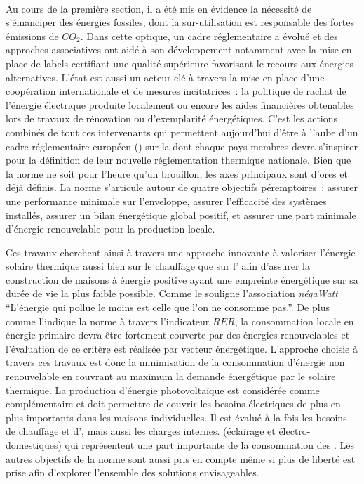 \paragraph{} %
Au cours de la première section, il a été mis en évidence la nécessité de s’émanciper des
énergies fossiles, dont la sur-utilisation est responsable des fortes émissions de
$CO_{2}$. Dans cette optique, un cadre réglementaire a évolué et des approches
associatives ont aidé à son développement notamment avec la mise en place de labels
certifiant une qualité supérieure favorisant le recours aux énergies alternatives. L’état est
aussi un acteur clé à travers la mise en place d’une coopération internationale et de
mesures incitatrices~: la politique de rachat de l’énergie électrique produite localement
ou encore les aides financières obtenables lors de travaux de rénovation ou d’exemplarité
énergétiques. C’est les actions combinés de tout ces intervenants qui permettent
aujourd’hui d’être à l’aube d’un cadre réglementaire européen () sur la
 dont chaque pays membres devra s’inspirer pour la définition de leur nouvelle
réglementation thermique nationale. Bien que la norme ne soit pour l’heure qu’un
brouillon, les axes principaux sont d’ores et déjà définis. La norme s’articule autour de
quatre objectifs péremptoires~: assurer une performance minimale sur l’enveloppe, assurer
l’efficacité des systèmes installés, assurer un bilan énergétique global positif, et
assurer une part minimale d’énergie renouvelable pour la production locale.

Ces travaux cherchent ainsi à travers une approche innovante à valoriser l’énergie
solaire thermique aussi bien sur le chauffage que sur l’ afin d’assurer
la construction de maisons à énergie positive ayant une empreinte énergétique sur
sa durée de vie la plus faible possible. Comme le souligne l’association \textit{négaWatt}
\enquote{L’énergie qui pollue le moins est celle que l’on ne consomme pas.}.
De plus comme l’indique la norme  à travers l’indicateur $RER$,
la consommation locale en énergie primaire devra être fortement couverte
par des énergies renouvelables et l’évaluation de ce critère est réalisée par vecteur énergétique.
L’approche choisie à travers ces travaux est donc la minimisation de la consommation
d’énergie non renouvelable en couvrant au maximum la demande énergétique par le solaire
thermique. La production d’énergie photovoltaïque
est considérée comme complémentaire et doit permettre de couvrir les besoins électriques
de plus en plus importants dans les maisons individuelles.
Il est évalué à la fois les besoins de chauffage et d’, mais aussi les charges internes.
(éclairage et électro-domestiques) qui représentent une part importante de la consommation des .
Les autres objectifs de la norme  sont aussi pris en compte
même si plus de liberté est prise afin d’explorer l’ensemble des solutions envisageables.

